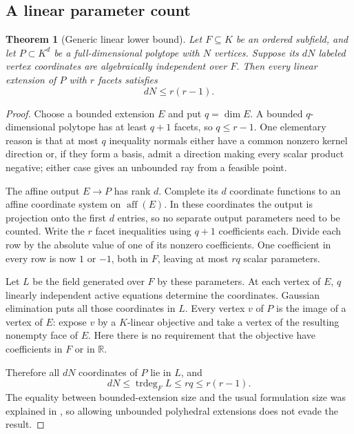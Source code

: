 \documentclass[11pt,a4paper]{article}
\numberwithin{equation}{section}
\newtheorem{theorem}{Theorem}[section]
\theoremstyle{plain}
\newcommand{\R}{\mathbb R}
\newcommand{\aff}{\operatorname{aff}}
\newcommand{\trdeg}{\operatorname{trdeg}}
\begin{document}
\subsection{A linear parameter count}
\begin{theorem}[Generic linear lower bound]\label{poly:ic:thm:genericlp}
Let $F\subseteq K$ be an ordered subfield, and let $P\subset K^d$ be a
full-dimensional polytope with $N$ vertices. Suppose its $dN$ labeled
vertex coordinates are algebraically independent over $F$. Then every
linear extension of $P$ with $r$ facets satisfies
\begin{equation}\label{poly:ic:eq:genericlp}
 dN\leq r(r-1).
\end{equation}
\end{theorem}
\begin{proof}
Choose a bounded extension $E$ and put $q=\dim E$. A bounded
$q$-dimensional polytope has at least $q+1$ facets, so $q\leq r-1$.
One elementary reason is that at most $q$ inequality normals either
have a common nonzero kernel direction or, if they form a basis, admit
a direction making every scalar product negative; either case gives
an unbounded ray from a feasible point.

The affine output $E\to P$ has rank $d$. Complete its $d$ coordinate
functions to an affine coordinate system on $\aff(E)$. In these coordinates
the output is projection onto the first $d$ entries, so no separate output
parameters need to be counted. Write the $r$ facet inequalities using
$q+1$ coefficients each. Divide each row by the absolute value of one
of its nonzero coefficients. One coefficient in every row is now $1$ or
$-1$, both in $F$, leaving at most $rq$ scalar parameters.

Let $L$ be the field generated over $F$ by these parameters. At each
vertex of $E$, $q$ linearly independent active equations determine the
coordinates. Gaussian elimination puts all those coordinates in $L$.
Every vertex $v$ of $P$ is the image of a vertex of $E$: expose $v$ by a
$K$-linear objective and take a vertex of the resulting nonempty face of
$E$. Here there is no requirement that the objective have coefficients
in $F$ or in $\R$.

Therefore all $dN$ coordinates of $P$ lie in $L$, and
\[
 dN\leq\trdeg_F L\leq rq\leq r(r-1).
\]
The equality between bounded-extension size and the usual formulation
size was explained in , so allowing unbounded polyhedral
extensions does not evade the result.
\end{proof}
\end{document}
